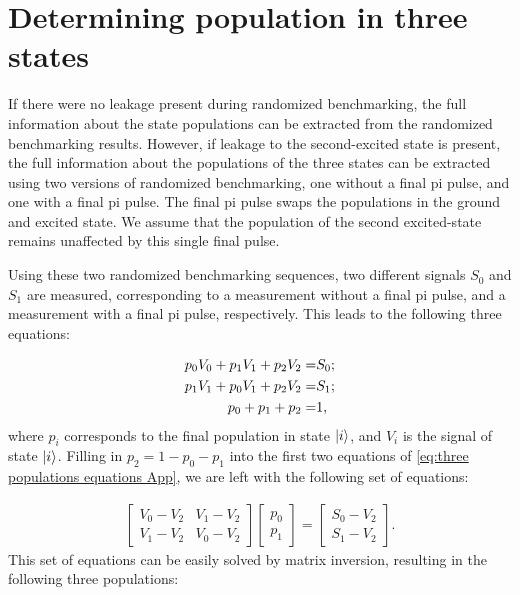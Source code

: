     \section{Determining population in three states}
      \label{ssec:Determining population in three states}
      If there were no leakage present during randomized benchmarking, the full information about the state populations can be extracted from the randomized benchmarking results. However, if leakage to the second-excited state is present, the full information about the populations of the three states can be extracted using two versions of randomized benchmarking, one without a final pi pulse, and one with a final pi pulse. The final pi pulse swaps the populations in the ground and excited state. We assume that the population of the second excited-state remains unaffected by this single final pulse.

      Using these two randomized benchmarking sequences, two different signals $S_0$ and $S_1$ are measured, corresponding to a measurement without a final pi pulse, and a measurement with a final pi pulse, respectively. This leads to the following three equations:

      \begin{align}
        p_0 V_0 + p_1 V_1 + p_2 V_2 = & S_0; \notag\\
        p_1 V_1 + p_0 V_1 + p_2 V_2 = & S_1; \notag\\
        p_0 + p_1 + p_2 = &   1,
        \label{eq:three populations equations App}
      \end{align}
      where $p_i$ corresponds to the final population in state $\ket{i}$, and $V_i$ is the signal of state $\ket{i}$. Filling in $p_2 = 1 - p_0 - p_1$ into the first two equations of \ref{eq:three populations equations App}, we are left with the following set of equations:

      \begin{align}
        \begin{bmatrix}
          V_0 - V_2 & V_1 - V_2 \\
          V_1 - V_2 & V_0 - V_2
        \end{bmatrix}
        \begin{bmatrix}
          p_0 \\
          p_1
        \end{bmatrix}
        =
        \begin{bmatrix}
          S_0 - V_2 \\
          S_1 - V_2
        \end{bmatrix}.
      \end{align}
      This set of equations can be easily solved by matrix inversion, resulting in the following three populations:

